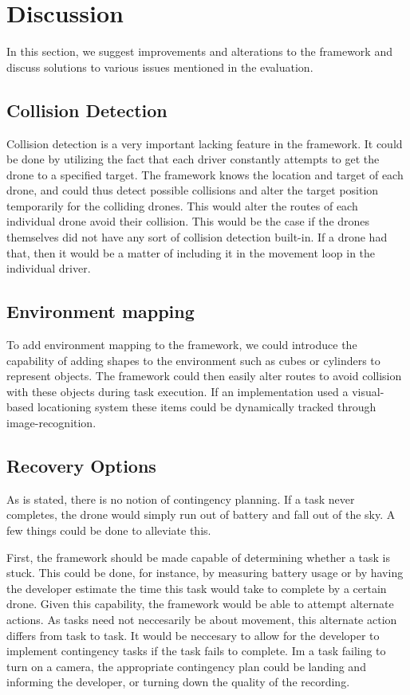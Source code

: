 \section{Discussion}
In this section, we suggest improvements and alterations to the framework and discuss solutions to various issues mentioned in the evaluation.

\subsection{Collision Detection}
Collision detection is a very important lacking feature in the framework. It could be done by utilizing the fact that each driver constantly attempts to get the drone to a specified target. The framework knows the location and target of each drone, and could thus detect possible collisions and alter the target position temporarily for the colliding drones. This would alter the routes of each individual drone avoid their collision. This would be the case if the drones themselves did not have any sort of collision detection built-in. If a drone had that, then it would be a matter of including it in the movement loop in the individual driver.

\subsection{Environment mapping}
To add environment mapping to the framework, we could introduce the capability of adding shapes to the environment such as cubes or cylinders to represent objects. The framework could then easily alter routes to avoid collision with these objects during task execution. If an implementation used a visual-based locationing system these items could be dynamically tracked through image-recognition.

\subsection{Recovery Options}
As is stated, there is no notion of contingency planning. If a task never completes, the drone would simply run out of battery and fall out of the sky. A few things could be done to alleviate this.

First, the framework should be made capable of determining whether a task is stuck. This could be done, for instance, by measuring battery usage or by having the developer estimate the time this task would take to complete by a certain drone. Given this capability, the framework would be able to attempt alternate actions. As tasks need not neccesarily be about movement, this alternate action differs from task to task. It would be neccesary to allow for the developer to implement contingency tasks if the task fails to complete. Im a task failing to turn on a camera, the appropriate contingency plan could be landing and informing the developer, or turning down the quality of the recording.

